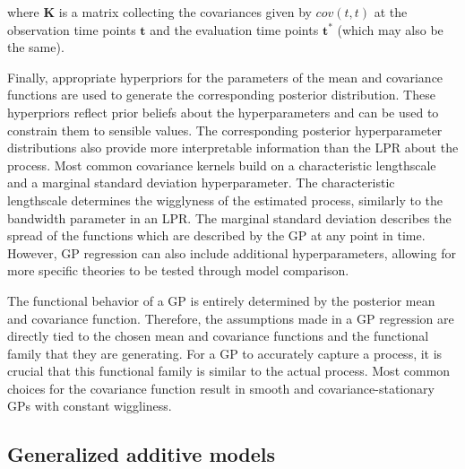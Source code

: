 \documentclass[man, floatsintext]{apa7}
\begin{document}
\noindent where $\textbf{K}$ is a matrix collecting the covariances given by
$cov(t, t)$ at the observation time points $\textbf{t}$ and the evaluation time
points $\textbf{t}^*$ (which may also be the same).

Finally, appropriate hyperpriors for the parameters of the mean and covariance
functions are used to generate the corresponding posterior distribution. These
hyperpriors reflect prior beliefs about the hyperparameters and can be used to
constrain them to sensible values. The corresponding posterior hyperparameter
distributions also provide more interpretable information than the LPR about
the process. Most common covariance kernels build on a characteristic
lengthscale and a marginal standard deviation hyperparameter. The
characteristic lengthscale determines the wigglyness of the estimated process,
similarly to the bandwidth parameter in an LPR\@. The marginal standard
deviation describes the spread of the functions which are described by the GP
at any point in time. However, GP regression can also include additional
hyperparameters, allowing for more specific theories to be tested through model
comparison.

The functional behavior of a GP is entirely determined by the posterior mean
and covariance function. Therefore, the assumptions made in a GP regression are
directly tied to the chosen mean and covariance functions and the functional
family that they are generating. For a GP to accurately capture a process, it
is crucial that this functional family is similar to the actual process. Most
common choices for the covariance function result in smooth and
covariance-stationary GPs with constant wiggliness.

\subsection{Generalized additive models}
\end{document}
